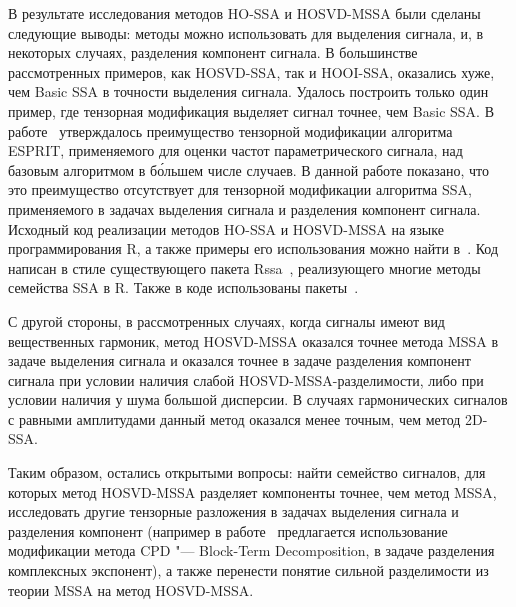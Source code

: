 \documentclass[specialist,
    substylefile = spbu.rtx,
    subf,href,colorlinks=true, 12pt]{disser}
\theoremstyle{plain}
\theoremstyle{definition}
\theoremstyle{remark}
\begin{document}
    В результате исследования методов HO-SSA и HOSVD-MSSA были сделаны следующие выводы:
    методы можно использовать для выделения сигнала, и, в некоторых случаях, разделения компонент сигнала.
    В большинстве рассмотренных примеров, как HOSVD-SSA, так и HOOI-SSA, оказались хуже,
    чем Basic SSA в точности выделения сигнала.
    Удалось построить только один пример, где тензорная модификация выделяет сигнал точнее, чем Basic SSA.
    В работе~\cite{hosvd-hooi-separation} утверждалось преимущество тензорной модификации алгоритма
    ESPRIT, применяемого для оценки частот параметрического сигнала, над базовым алгоритмом в б\'{о}льшем числе случаев.
    В данной работе показано, что это преимущество отсутствует для тензорной модификации алгоритма SSA, применяемого в задачах выделения сигнала и разделения компонент сигнала.
    Исходный код реализации методов HO-SSA и HOSVD-MSSA на языке программирования R, а также
    примеры его использования можно найти в~\cite{Rcode}.
    Код написан в стиле существующего пакета Rssa~\cite{Rssa-pack, Rssa}, реализующего многие методы семейства SSA в R.
    Также в коде использованы пакеты~\cite{rTensor-pack, tensr-pack, purrr-pack}.

    С другой стороны, в рассмотренных случаях, когда сигналы имеют вид вещественных гармоник, метод HOSVD-MSSA оказался
    точнее метода MSSA в задаче выделения сигнала и оказался точнее в задаче разделения компонент сигнала
    при условии наличия слабой HOSVD-MSSA-разделимости, либо при условии наличия у шума большой дисперсии.
    В случаях гармонических сигналов с равными амплитудами данный метод оказался менее точным, чем метод 2D-SSA.

    Таким образом, остались открытыми вопросы: найти семейство сигналов, для которых метод HOSVD-MSSA
    разделяет компоненты точнее, чем метод MSSA, исследовать другие тензорные разложения в задачах выделения сигнала
    и разделения компонент (например в работе~\cite{cpd-separation} предлагается использование модификации метода CPD
    "--- Block-Term Decomposition, в задаче разделения комплексных экспонент), а также
    перенести понятие сильной разделимости из теории MSSA на метод HOSVD-MSSA.

    
    
\end{document}
